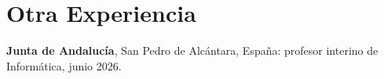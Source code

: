 \documentclass[a4paper,10pt]{article}
\begin{document}
\vspace{-4pt}

\section{Otra Experiencia}
\small
\noindent\textbf{Junta de Andalucía}, San Pedro de Alcántara, España: profesor interino de Informática, junio 2026.
\end{document}
